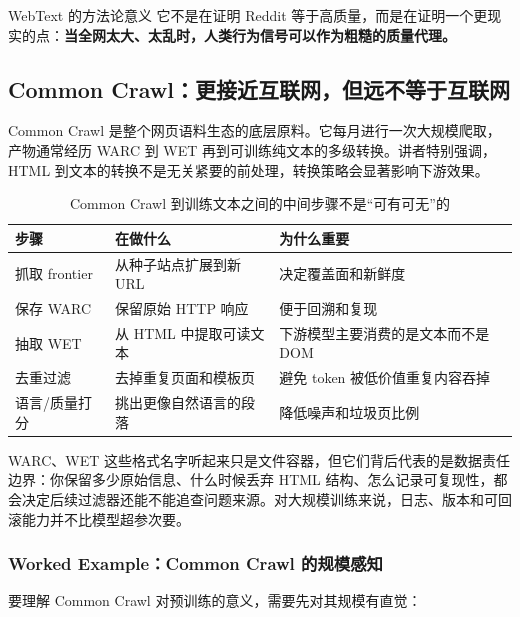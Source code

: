 \documentclass[a4paper]{article}
\begin{document}
\begin{importantbox}{WebText 的方法论意义}
它不是在证明 Reddit 等于高质量，而是在证明一个更现实的点：\textbf{当全网太大、太乱时，人类行为信号可以作为粗糙的质量代理。}
\end{importantbox}

\subsection{Common Crawl：更接近互联网，但远不等于互联网}

Common Crawl 是整个网页语料生态的底层原料。它每月进行一次大规模爬取，产物通常经历 WARC 到 WET 再到可训练纯文本的多级转换。讲者特别强调，HTML 到文本的转换不是无关紧要的前处理，转换策略会显著影响下游效果。

\begin{table}[H]
\centering
\begin{tabular}{p{}p{}p{}}
\toprule
\textbf{步骤} & \textbf{在做什么} & \textbf{为什么重要} \\
\midrule
抓取 frontier & 从种子站点扩展到新 URL & 决定覆盖面和新鲜度 \\
保存 WARC & 保留原始 HTTP 响应 & 便于回溯和复现 \\
抽取 WET & 从 HTML 中提取可读文本 & 下游模型主要消费的是文本而不是 DOM \\
去重过滤 & 去掉重复页面和模板页 & 避免 token 被低价值重复内容吞掉 \\
语言/质量打分 & 挑出更像自然语言的段落 & 降低噪声和垃圾页比例 \\
\bottomrule
\end{tabular}
\caption{Common Crawl 到训练文本之间的中间步骤不是“可有可无”的}
\end{table}

WARC、WET 这些格式名字听起来只是文件容器，但它们背后代表的是数据责任边界：你保留多少原始信息、什么时候丢弃 HTML 结构、怎么记录可复现性，都会决定后续过滤器还能不能追查问题来源。对大规模训练来说，日志、版本和可回滚能力并不比模型超参次要。

\subsubsection{Worked Example：Common Crawl 的规模感知}

要理解 Common Crawl 对预训练的意义，需要先对其规模有直觉：
\end{document}
